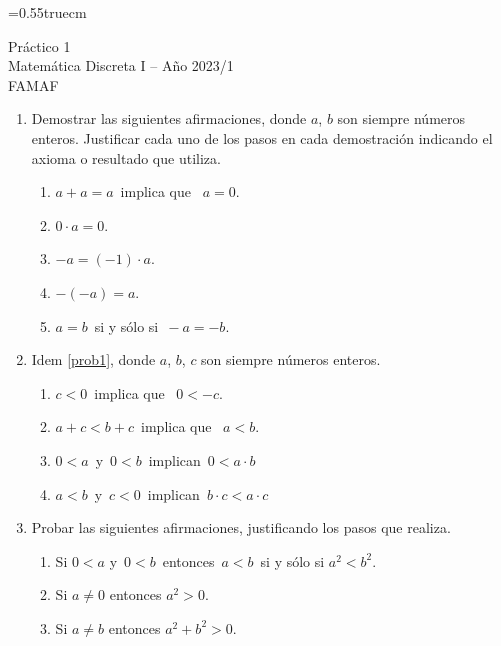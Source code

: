 \documentclass[a4paper,12pt,twoside,spanish,reqno]{amsbook}
\numberwithin{equation}{section}
\begin{document}
    \baselineskip=0.55truecm %
    

{\bf \begin{center}\large  Práctico 1 \\ Matemática Discreta I -- Año 2023/1 \\ FAMAF \end{center}}


\begin{enumerate}
\item\label{prob1} Demostrar las siguientes afirmaciones, donde $a$, $b$ son siempre números \linebreak enteros. Justificar cada uno de los pasos en cada demostración indicando el axioma o resultado que utiliza.
\begin{enumerate}
	\item $a+a=a$\, implica que \,  $a=0$.
	\item $0\cdot a = 0$.
	\item $-a = (-1)\cdot a$.
    \item  $-(-a) = a$.
    \item  $a=b\,$ si y sólo si $\,-a=-b$.
\end{enumerate}




\item Idem \ref{prob1}, donde $a$, $b$, $c$ son siempre números enteros.

\begin{enumerate}
	\item $c<0$\, implica que \, $0 < -c$.
	\item $a+c <b+c$\, implica que \, $a<b$.
    \item $0<a\,$ y $\,0<b\,$ implican $\,0<a\cdot b$
    \item $a<b\,$ y $\,c<0$\, implican $\,b\cdot c<a\cdot c$
\end{enumerate}



\item  Probar las siguientes afirmaciones, justificando los pasos que realiza.
\begin{enumerate}
  \item Si $0 < a$  y $\,0<b\,$ entonces $\,a<b\,$ si y sólo si $a^2<b^2$.
  \item Si $a\neq 0$  entonces $a^2>0$.
  \item Si $a\neq b$  entonces $a^2+b^2>0$.
\end{enumerate}



\end{enumerate}
\end{document}
